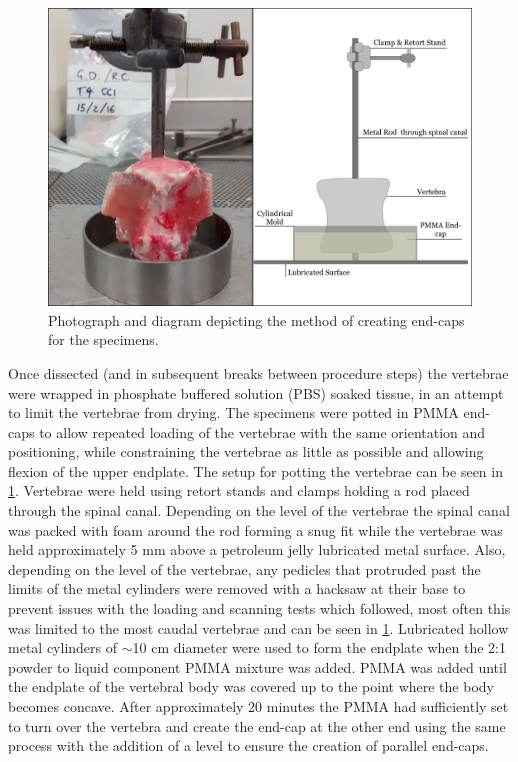 \begin{figure}[ht!]
\centering
\includegraphics[width=5in]{images/potting_vertebra.png}
\caption{Photograph and diagram depicting the method of creating end-caps for the specimens.}
\label{fig:potting_vertebra}
\end{figure}



Once dissected (and in subsequent breaks between procedure steps) the
vertebrae were wrapped in phosphate buffered solution (PBS) soaked
tissue, in an attempt to limit the vertebrae from drying.
The specimens were potted in PMMA end-caps to allow repeated loading of the vertebrae with
the same orientation and positioning, while constraining the vertebrae
as little as possible and allowing flexion of the upper endplate. The setup for potting the vertebrae can be seen in \cref{fig:potting_vertebra}.
Vertebrae were held using retort stands and clamps holding a rod placed
through the spinal canal. Depending on the level of the vertebrae the
spinal canal was packed with foam around the rod forming a snug fit
while the vertebrae was held approximately 5 mm above a petroleum jelly
lubricated metal surface. Also, depending on the level of the vertebrae,
any pedicles that protruded past the limits of the metal cylinders were
removed with a hacksaw at their base to prevent issues with the loading
and scanning tests which followed, most often this was limited to the
most caudal vertebrae and can be seen in \cref{fig:potting_vertebra}. Lubricated hollow metal cylinders of \(\sim\)10
cm diameter were used to form the endplate when the 2:1 powder to liquid
component PMMA mixture was added. PMMA was added until the endplate of
the vertebral body was covered up to the point where the body becomes
concave. After approximately 20 minutes the PMMA had sufficiently set to turn over
the vertebra and create the end-cap at the other end using the same
process with the addition of a level to ensure the creation of parallel
end-caps.


